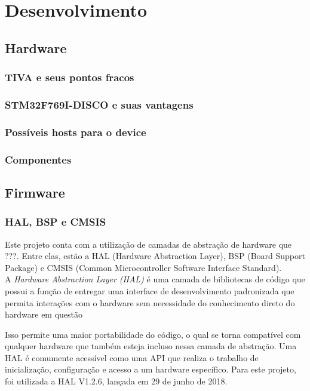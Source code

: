 \chapter{Desenvolvimento}
\section{Hardware}
\subsection{TIVA e seus pontos fracos}
\subsection{STM32F769I-DISCO e suas vantagens}
\subsection{Possíveis hosts para o device}
\subsection{Componentes}
\section{Firmware}
\subsection{HAL, BSP e CMSIS}
Este projeto conta com a utilização de camadas de abstração de hardware que ???. Entre elas, estão a HAL (Hardware Abstraction Layer), BSP (Board Support Package) e CMSIS (Common Microcontroller Software Interface Standard).
\\[10pt]


A \textit{Hardware Abstraction Layer (HAL)} é uma camada de bibliotecas de código que possui a função de entregar uma interface de desenvolvimento padronizada que permita interações com o hardware sem necessidade do conhecimento direto do hardware em questão 

Isso permite uma maior portabilidade do código, o qual se torna compatível com qualquer hardware que também esteja incluso nessa camada de abstração.
Uma HAL é comumente acessível como uma API que realiza o trabalho de inicialização, configuração e acesso a um hardware específico. Para este projeto, foi utilizada a HAL V1.2.6, lançada em 29 de junho de 2018.
\\[10pt]

